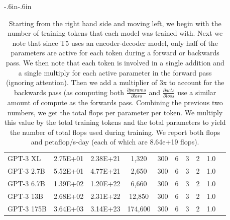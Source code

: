 \documentclass{article}
\begin{document}
\begin{table}[!h]
\begin{adjustwidth}{-.6in}{-.6in}
{\begin{center}
\begin{tabular}{lccccccccc}
                  GPT-3 XL &                      2.75E+01 &                    2.38E+21 &      1,320 &                        300 &                               6 &                       3 &                                         2 &                                      1.0 &   \\
                GPT-3 2.7B &                      5.52E+01 &                    4.77E+21 &      2,650 &                        300 &                               6 &                       3 &                                         2 &                                      1.0 &   \\
                GPT-3 6.7B &                      1.39E+02 &                    1.20E+22 &      6,660 &                        300 &                               6 &                       3 &                                         2 &                                      1.0 &   \\
                 GPT-3 13B &                      2.68E+02 &                    2.31E+22 &     12,850 &                        300 &                               6 &                       3 &                                         2 &                                      1.0 &   \\
                GPT-3 175B &                      3.64E+03 &                    3.14E+23 &    174,600 &                        300 &                               6 &                       3 &                                         2 &                                      1.0 &   \\
            \bottomrule
            \end{tabular}
            \end{center}
            }
            
\end{adjustwidth}
        \caption{
Starting from the right hand side and moving left, we begin with the number of training tokens that each model was trained with. Next we note that since T5 uses an encoder-decoder model, only half of the parameters are active for each token during a forward or backwards pass. We then note that each token is involved in a single addition and a single multiply for each active parameter in the forward pass (ignoring attention). Then we add a multiplier of 3x to account for the backwards pass (as computing both $\frac{\partial{params}}{\partial{loss}}$ and $\frac{\partial{acts}}{\partial{loss}}$ use a similar amount of compute as the forwards pass. Combining the previous two numbers, we get the total flops per parameter per token. We multiply this value by the total training tokens and the total parameters to yield the number of total flops used during training. We report both flops and petaflop/s-day (each of which are 8.64e+19 flops).
        }

\label{table:total_compute_calculations}
\end{table}
\end{document}
